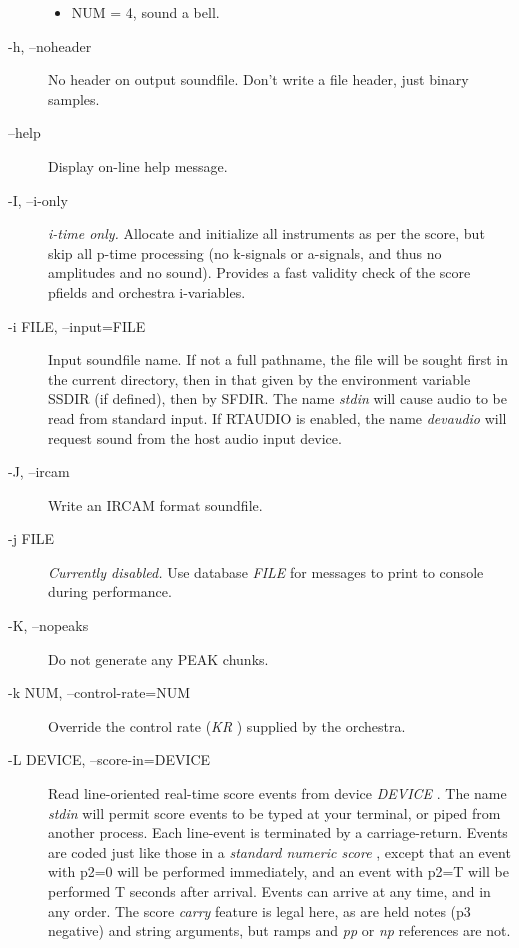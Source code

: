 \begin{description}
\begin{itemize}
\item 

 NUM = 4, sound a bell.


\end{itemize}

\item[-h, --noheader]

  No header on output soundfile. Don't write a file header, just binary samples. 

\item[--help]

  Display on-line help message. 

\item[-I, --i-only]

 \emph{i-time only.}
 Allocate and initialize all instruments as per the score, but skip all p-time processing (no k-signals or a-signals, and thus no amplitudes and no sound). Provides a fast validity check of the score pfields and orchestra i-variables. 

\item[-i FILE, --input=FILE]

  Input soundfile name. If not a full pathname, the file will be sought first in the current directory, then in that given by the environment variable SSDIR (if defined), then by SFDIR. The name \emph{stdin}
 will cause audio to be read from standard input. If RTAUDIO is enabled, the name \emph{devaudio}
 will request sound from the host audio input device. 

\item[-J, --ircam]

  Write an IRCAM format soundfile. 

\item[-j FILE]

 \emph{Currently disabled.}
 Use database \emph{FILE}
 for messages to print to console during performance. 

\item[-K, --nopeaks]

  Do not generate any PEAK chunks. 

\item[-k NUM, --control-rate=NUM]

  Override the control rate (\emph{KR}
) supplied by the orchestra. 

\item[-L DEVICE, --score-in=DEVICE]

  Read line-oriented real-time score events from device \emph{DEVICE}
. The name \emph{stdin}
 will permit score events to be typed at your terminal, or piped from another process. Each line-event is terminated by a carriage-return. Events are coded just like those in a \emph{standard numeric score}
, except that an event with p2=0 will be performed immediately, and an event with p2=T will be performed T seconds after arrival. Events can arrive at any time, and in any order. The score \emph{carry}
 feature is legal here, as are held notes (p3 negative) and string arguments, but ramps and \emph{pp}
 or \emph{np}
 references are not. 


\end{description}
